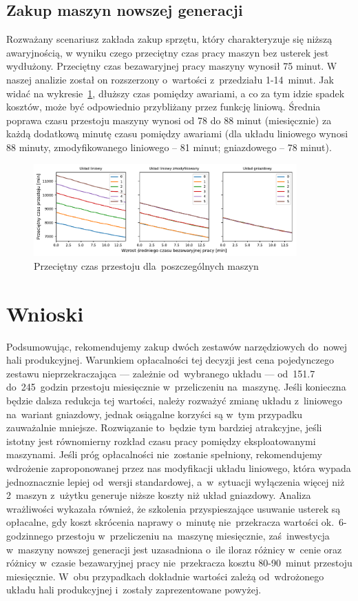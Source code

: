 \documentclass[12pt, a4paper, oneside]{mwart} %
\begin{document}
\subsection{Zakup maszyn nowszej generacji}
Rozważany scenariusz zakłada zakup sprzętu, który charakteryzuje się niższą awaryjnością, w wyniku czego przeciętny czas pracy maszyn bez usterek jest wydłużony. Przeciętny czas bezawaryjnej pracy maszyny wynosił 75 minut. W naszej analizie został on rozszerzony o~wartości z~przedziału 1-14~minut. Jak widać na wykresie~\ref{wyk_bezawaryjna_praca}, dłuższy czas pomiędzy awariami, a co za tym idzie spadek kosztów, może być odpowiednio przybliżany przez funkcję liniową. Średnia poprawa czasu przestoju maszyny wynosi od 78 do 88 minut (miesięcznie) za każdą dodatkową minutę czasu pomiędzy awariami (dla układu liniowego wynosi 88 minuty, zmodyfikowanego liniowego – 81 minut; gniazdowego – 78 minut).
\begin{figure}
\centering
\caption{Przeciętny czas przestoju dla~poszczególnych maszyn}
\label{wyk_bezawaryjna_praca}
\includegraphics[width = 0.9\textwidth]{wykresy/bezawaryjna_praca.pdf}
\end{figure}

\section{Wnioski}
Podsumowując, rekomendujemy zakup dwóch zestawów narzędziowych do~nowej hali produkcyjnej. Warunkiem opłacalności tej decyzji jest cena pojedynczego zestawu nieprzekraczająca --- zależnie od~wybranego układu --- od~151.7 do~245~godzin przestoju miesięcznie w~przeliczeniu na~maszynę. Jeśli konieczna będzie dalsza redukcja tej wartości, należy rozważyć zmianę układu z~liniowego na~wariant gniazdowy, jednak osiągalne korzyści są w~tym przypadku zauważalnie mniejsze. Rozwiązanie to~będzie tym bardziej atrakcyjne, jeśli istotny jest równomierny rozkład czasu pracy pomiędzy eksploatowanymi maszynami. Jeśli próg opłacalności nie~zostanie spełniony, rekomendujemy wdrożenie zaproponowanej przez nas modyfikacji układu liniowego, która wypada jednoznacznie lepiej od~wersji standardowej, a~w~sytuacji wyłączenia więcej niż 2~maszyn z~użytku generuje niższe koszty niż układ gniazdowy. Analiza wrażliwości wykazała również, że szkolenia przyspieszające usuwanie usterek są opłacalne, gdy koszt skrócenia naprawy o~minutę nie~przekracza wartości ok.~6-godzinnego przestoju w~przeliczeniu na~maszynę miesięcznie, zaś~inwestycja w~maszyny nowszej generacji jest uzasadniona o~ile iloraz różnicy w~cenie oraz różnicy w~czasie bezawaryjnej pracy nie~przekracza kosztu 80-90~minut przestoju miesięcznie. W~obu przypadkach dokładnie wartości zależą od~wdrożonego układu hali produkcyjnej i~zostały zaprezentowane powyżej.
\end{document}
